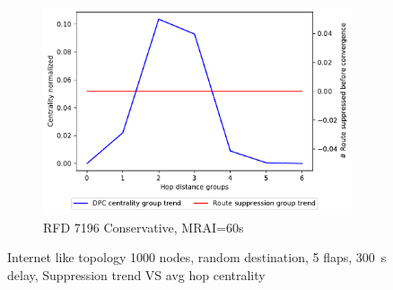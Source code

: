 \begin{figure}[H]
\begin{subfigure}[b]{0.325\textwidth}
     \end{subfigure}
     \hfill
     \begin{subfigure}[b]{0.325\textwidth}
         \centering
         \includegraphics[width=\textwidth]{images/RFD/miceVSelephants/MultiMRAI/60/mice/cisco_1000_RFD_7196_conservative_nodeConvergence_centVSsup_trend.pdf}
         \caption{\scriptsize RFD 7196 Conservative, MRAI=60s}
         \label{fig:1000_7196RFDC_centVSsup_mices_MRAI60}
     \end{subfigure}
		\caption{\scriptsize Internet like topology \num{1000} nodes, random
		destination, \num{5} flaps, \SI{300}{\second} delay, Suppression trend VS avg hop centrality}
        \label{fig:1000_RFD_centVSsup_mices}
\end{figure}

